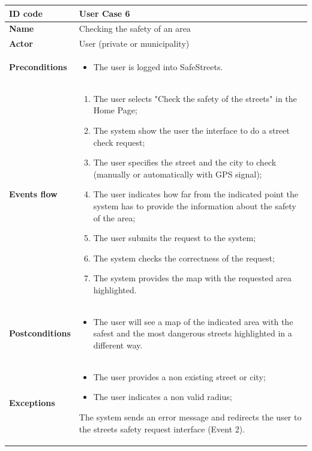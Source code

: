 \documentclass[titlepage]{article}
\begin{document}
\begin{longtable}{| p{3 cm} | p{10 cm} |} 
\hline

\textbf{ID code} & User Case 6 \\ \hline
\textbf{Name} & Checking the safety of an area \\ \hline
\textbf{Actor} & User (private or municipality) \\ \hline
\textbf{Preconditions} & 
\begin{itemize}
\item The user is logged into SafeStreets.
\end{itemize}\\ \hline

\textbf{Events flow} &
\begin{enumerate}
\item The user selects "Check the safety of the streets" in the Home Page;
\item The system show the user the interface to do a street check request;
\item The user specifies the street and the city to check (manually or automatically with GPS signal);
\item The user indicates how far from the indicated point the system has to provide the information about the safety of the area;
\item The user submits the request to the system;
\item The system checks the correctness of the request;
\item The system provides the map with the requested area highlighted. 
\end{enumerate} \\ \hline
\textbf{Postconditions} & 
\begin{itemize}
\item The user will see a map of the indicated area with the safest and the most dangerous streets highlighted in a different way.
\end{itemize} \\ \hline
\textbf{Exceptions} &
\begin{itemize}
\item The user provides a non existing street or city;
\item The user indicates a non valid radius;
\end{itemize}
The system sends an error message and redirects the user to the streets safety request interface (Event 2). \\ \hline



\end{longtable}
\end{document}
